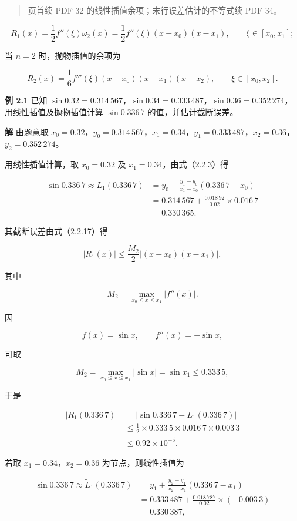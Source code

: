 \documentclass[
  10pt,
  fontset=fandol]{ctexart}
\begin{document}
\begin{quote}
页首续 PDF 32 的线性插值余项；末行误差估计的不等式续 PDF 34。
\end{quote}

\[
R_1(x)=\frac12 f''(\xi)\omega_2(x)
=\frac12 f''(\xi)(x-x_0)(x-x_1),
\qquad \xi\in[x_0,x_1];
\tag{2.2.17}
\]

当 \(n=2\) 时，抛物插值的余项为

\[
R_2(x)=\frac16 f'''(\xi)(x-x_0)(x-x_1)(x-x_2),
\qquad \xi\in[x_0,x_2].
\tag{2.2.18}
\]

\textbf{例 2.1} 已知 \(\sin0.32=0.314\,567\)，\(\sin0.34=0.333\,487\)，\(\sin0.36=0.352\,274\)，用线性插值及抛物插值计算 \(\sin0.336\,7\) 的值，并估计截断误差。

\textbf{解} 由题意取 \(x_0=0.32\)，\(y_0=0.314\,567\)，\(x_1=0.34\)，\(y_1=0.333\,487\)，\(x_2=0.36\)，\(y_2=0.352\,274\)。

用线性插值计算，取 \(x_0=0.32\) 及 \(x_1=0.34\)，由式（2.2.3）得

\[
\begin{aligned}
\sin0.336\,7\approx L_1(0.336\,7)
&=y_0+\frac{y_1-y_0}{x_1-x_0}(0.336\,7-x_0)\\
&=0.314\,567+\frac{0.018\,92}{0.02}\times0.016\,7\\
&=0.330\,365.
\end{aligned}
\]

其截断误差由式（2.2.17）得

\[
|R_1(x)|\le\frac{M_2}{2}|(x-x_0)(x-x_1)|,
\]

其中

\[
M_2=\max_{x_0\le x\le x_1}|f''(x)|.
\]

因

\[
f(x)=\sin x,\qquad f''(x)=-\sin x,
\]

可取

\[
M_2=\max_{x_0\le x\le x_1}|\sin x|=\sin x_1\le0.333\,5,
\]

于是

\[
\begin{aligned}
|R_1(0.336\,7)|
&=|\sin0.336\,7-L_1(0.336\,7)|\\
&\le\frac12\times0.333\,5\times0.016\,7\times0.003\,3\\
&\le0.92\times10^{-5}.
\end{aligned}
\]

若取 \(x_1=0.34\)，\(x_2=0.36\) 为节点，则线性插值为

\[
\begin{aligned}
\sin0.336\,7\approx\widetilde L_1(0.336\,7)
&=y_1+\frac{y_2-y_1}{x_2-x_1}(0.336\,7-x_1)\\
&=0.333\,487+\frac{0.018\,787}{0.02}\times(-0.003\,3)\\
&=0.330\,387,
\end{aligned}
\]
\end{document}
